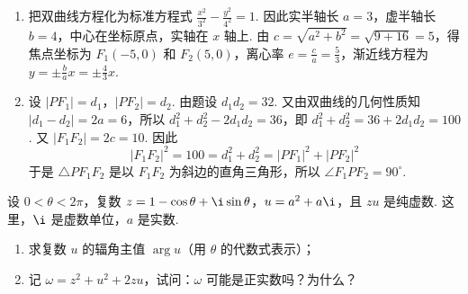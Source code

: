 \begin{solution}
\begin{enumerate}
\item 把双曲线方程化为标准方程式 \(\frac{x^2}{3^2}-\frac{y^2}{4^2}=1\). 因此实半轴长 \(a=3\)，虚半轴长 \(b=4\)，中心在坐标原点，实轴在 \(x\) 轴上. 由 \(c=\sqrt{a^2+b^2}=\sqrt{9+16}=5\)，得焦点坐标为 \(F_1(-5,0)\) 和 \(F_2(5,0)\)，离心率 \(e=\frac{c}{a}=\frac{5}{3}\)，渐近线方程为 \(y=\pm\frac{b}{a}x=\pm\frac{4}{3}x\).
\end{enumerate}


\begin{enumerate}
\setcounter{enumi}{1}
\item 设 \(\left|PF_1\right|=d_1\)，\(\left|PF_2\right|=d_2\). 由题设 \(d_1d_2=32\). 又由双曲线的几何性质知 \(\left|d_1-d_2\right|=2a=6\)，所以 \(d_1^2+d_2^2-2d_1d_2=36\)，即 \(d_1^2+d_2^2=36+2d_1d_2=100\). 又 \(\left|F_1F_2\right|=2c=10\). 因此
\[
\left|F_1F_2\right|^2=100=d_1^2+d_2^2=\left|PF_1\right|^2+\left|PF_2\right|^2
\]
于是 \(\triangle PF_1F_2\) 是以 \(F_1F_2\) 为斜边的直角三角形，所以 \(\angle F_1PF_2=90^{\circ}\).
\end{enumerate}
\end{solution}

\begin{problem}
设 \(0 < \theta < 2\pi\)，复数 \(z = 1 - \cos \theta + \i \sin \theta\)，\(u = a^2 + a\i\)，且 \(zu\) 是纯虚数. 这里，\(\i\) 是虚数单位，\(a\) 是实数.
\begin{enumerate}
\item 求复数 \(u\) 的辐角主值 \(\arg u\)（用 \(\theta\) 的代数式表示）；
\item 记 \(\omega = z^2 + u^2 + 2zu\)，试问：\(\omega\) 可能是正实数吗？为什么？
\end{enumerate}
\end{problem}

